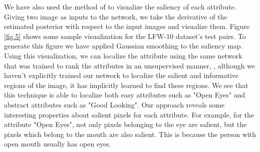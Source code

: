 We have also used the method of \cite{saliency} to visualize the saliency of each attribute. Giving two image as inputs to the network, we take the derivative of the estimated posterior with respect to the input images and visualize them. Figure \ref{fig.5} shows some sample visualization for the LFW-10 dataset's test pairs. To generate this figure we have applied Gaussian smoothing to the saliency map.
Using this visualization, we can localize the attribute using the same network that was trained to rank the attributes in an unsupervised manner, \ie, although we haven't explicitly trained our network to localize the salient and informative regions of the image, %
it has implicitly learned to find these regions. We see that this technique is able to localize both easy attributes such as "Open Eyes" and abstract attributes such as "Good Looking". Our approach reveals some interesting properties about salient pixels for each attribute. For example, for the attribute "Open Eyes", not only pixels belonging to the eye are salient, but the pixels which belong to the mouth are also salient. This is because the person with open mouth usually has open eyes.

